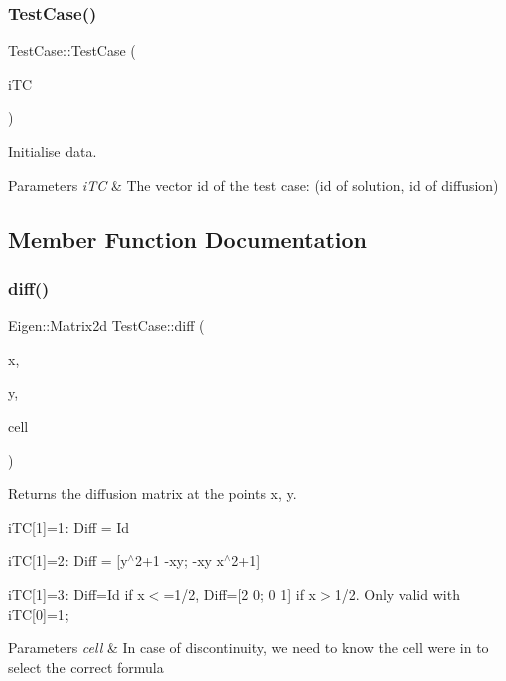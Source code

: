 \subsubsection{\texorpdfstring{Test\+Case()}{TestCase()}}
{\footnotesize\ttfamily Test\+Case\+::\+Test\+Case (\begin{DoxyParamCaption}\item[{const std\+::vector$<$ int $>$}]{i\+TC }\end{DoxyParamCaption})}



Initialise data. 


\begin{DoxyParams}{Parameters}
{\em i\+TC} & The vector id of the test case\+: (id of solution, id of diffusion) \\
\hline
\end{DoxyParams}


\subsection{Member Function Documentation}
\mbox{\label{classTestCase_aaf745f4815ce0e9c16d8bded9f9b3596}} 
\subsubsection{\texorpdfstring{diff()}{diff()}}
{\footnotesize\ttfamily Eigen\+::\+Matrix2d Test\+Case\+::diff (\begin{DoxyParamCaption}\item[{const double}]{x,  }\item[{const double}]{y,  }\item[{const \hyperlink{classHArDCore2D_1_1Cell}{Cell} $\ast$}]{cell }\end{DoxyParamCaption})}



Returns the diffusion matrix at the points x, y. 

i\+TC\mbox{[}1\mbox{]}=1\+: Diff = Id

i\+TC\mbox{[}1\mbox{]}=2\+: Diff = \mbox{[}y$^\wedge$2+1 -\/xy; -\/xy x$^\wedge$2+1\mbox{]}

i\+TC\mbox{[}1\mbox{]}=3\+: Diff=Id if x$<$=1/2, Diff=\mbox{[}2 0; 0 1\mbox{]} if x$>$1/2. Only valid with i\+TC\mbox{[}0\mbox{]}=1; 
\begin{DoxyParams}{Parameters}
{\em cell} & In case of discontinuity, we need to know the cell we\textquotesingle{}re in to select the correct formula \\
\hline
\end{DoxyParams}
\mbox{\label{classTestCase_aa32221ff5dd860c050a28661406a87dc}} 
